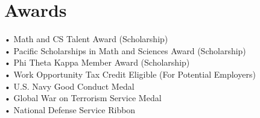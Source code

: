 \documentclass[letterpaper]{deedy-resume} %
\begin{document}
\begin{minipage}[t]{0.33\textwidth}
\section{Awards} 
•  Math and CS Talent Award (Scholarship)\\
•  Pacific Scholarships in Math and Sciences Award (Scholarship)\\
•  Phi Theta Kappa Member Award (Scholarship)\\
•  Work Opportunity Tax Credit Eligible (For Potential Employers)\\
•  U.S. Navy Good Conduct Medal\\
•  Global War on Terrorism Service Medal\\
•  National Defense Service Ribbon


\sectionspace %

\end{minipage} %
\hfill
%
%
\end{document}

